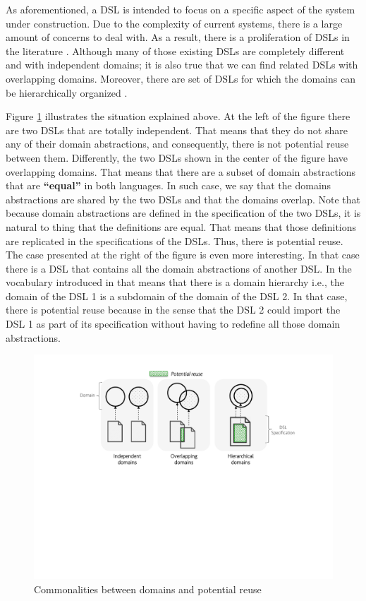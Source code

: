As aforementioned, a DSL is intended to focus on a specific aspect of the system under construction. Due to the complexity of current systems, there is a large amount of concerns to deal with. As a result, there is a proliferation of DSLs in the literature \cite{Mernik:2005b}. Although many of those existing DSLs are completely different and with independent domains; it is also true that we can find related DSLs with overlapping domains. Moreover, there are set of DSLs for which the domains can be hierarchically organized \cite[p. 60-61]{voelter:2013}.

Figure \ref{fig:domains} illustrates the situation explained above. At the left of the figure there are two DSLs that are totally independent. That means that they do not share any of their domain abstractions, and consequently, there is not potential reuse between them. Differently, the two DSLs shown in the center of the figure have overlapping domains. That means that there are a subset of domain abstractions that are \large\textbf{``equal'' }\normalsize in both languages. In such case, we say that the domains abstractions are shared by the two DSLs and that the domains overlap. Note that because domain abstractions are defined in the specification of the two DSLs, it is natural to thing that the definitions are equal. That means that those definitions are replicated in the specifications of the DSLs. Thus, there is potential reuse. The case presented at the right of the figure is even more interesting. In that case there is a DSL that contains all the domain abstractions of another DSL. In the vocabulary introduced in \cite[p. 60-61]{voelter:2013} that means that there is a domain hierarchy i.e., the domain of the DSL 1 is a subdomain of the domain of the DSL 2. In that case, there is potential reuse because in the sense that the DSL 2 could import the DSL 1 as part of its specification without having to redefine all those domain abstractions. 

\begin{figure}
\centering
\includegraphics[width=1\linewidth]{images/domains-fig.pdf}
\caption{Commonalities between domains and potential reuse}
\label{fig:domains}
\end{figure}

